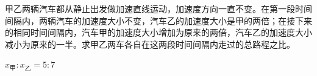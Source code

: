 甲乙两辆汽车都从静止出发做加速直线运动，加速度方向一直不变。在第一段时间间隔内，两辆汽车的加速度大小不变，汽车乙的加速度大小是甲的两倍；在接下来的相同时间间隔内，汽车甲的加速度大小增加为原来的两倍，汽车乙的加速度大小减小为原来的一半。求甲乙两车各自在这两段时间间隔内走过的总路程之比。
\begin{answer}
	\(x_{\text{甲}}:x_{\text{乙}} = 5:7\)
\end{answer}